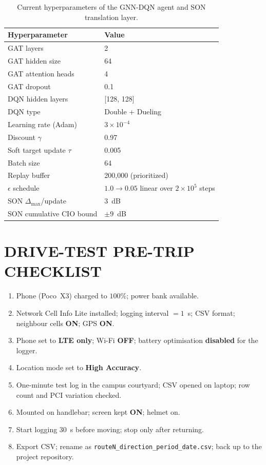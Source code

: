 \documentclass[12pt,a4paper,oneside]{report}
\begin{document}
\begin{table}[H]
    \centering
    \caption{Current hyperparameters of the GNN-DQN agent and SON
    translation layer.}
    \footnotesize
    \begin{tabularx}{0.85\textwidth}{Xl}
        \toprule
        \textbf{Hyperparameter} & \textbf{Value}\\
        \midrule
        GAT layers                  & 2\\
        GAT hidden size             & 64\\
        GAT attention heads         & 4\\
        GAT dropout                 & 0.1\\
        DQN hidden layers           & [128, 128]\\
        DQN type                    & Double + Dueling\\
        Learning rate (Adam)        & $3 \times 10^{-4}$\\
        Discount $\gamma$           & 0.97\\
        Soft target update $\tau$   & 0.005\\
        Batch size                  & 64\\
        Replay buffer               & 200{,}000 (prioritized)\\
        $\epsilon$ schedule         & $1.0 \to 0.05$ linear over
        $2{\times}10^{5}$ steps\\
        SON $\Delta_{\max}$/update  & 3~dB\\
        SON cumulative CIO bound    & $\pm 9$~dB\\
        \bottomrule
    \end{tabularx}
\end{table}

\chapter{DRIVE-TEST PRE-TRIP CHECKLIST}

\begin{enumerate}[leftmargin=*]
    \item Phone (Poco~X3) charged to $100\%$; power bank available.
    \item Network Cell Info Lite installed; logging interval $= 1$~s;
    CSV format; neighbour cells \textbf{ON}; GPS \textbf{ON}.
    \item Phone set to \textbf{LTE only}; Wi-Fi \textbf{OFF}; battery
    optimisation \textbf{disabled} for the logger.
    \item Location mode set to \textbf{High Accuracy}.
    \item One-minute test log in the campus courtyard; CSV opened on
    laptop; row count and PCI variation checked.
    \item Mounted on handlebar; screen kept \textbf{ON}; helmet on.
    \item Start logging $30$~s before moving; stop only after returning.
    \item Export CSV; rename as
    \texttt{routeN\_direction\_period\_date.csv}; back up to the
    project repository.
\end{enumerate}
\end{document}
